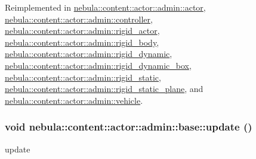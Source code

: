 Reimplemented in \hyperlink{classnebula_1_1content_1_1actor_1_1admin_1_1actor_af4b68cdf9481cd0ad5f56a78bb691997}{nebula::content::actor::admin::actor}, \hyperlink{classnebula_1_1content_1_1actor_1_1admin_1_1controller_a0cac5286fe3874391eea6dabae7ce06a}{nebula::content::actor::admin::controller}, \hyperlink{classnebula_1_1content_1_1actor_1_1admin_1_1rigid__actor_aba5200b2e542e3f0433c89ef026c5673}{nebula::content::actor::admin::rigid\_\-actor}, \hyperlink{classnebula_1_1content_1_1actor_1_1admin_1_1rigid__body_a91d4e1a3e78ee41a5ddea1974a88045d}{nebula::content::actor::admin::rigid\_\-body}, \hyperlink{classnebula_1_1content_1_1actor_1_1admin_1_1rigid__dynamic_ae5350e2820c0e00c36c663fc63a8b83c}{nebula::content::actor::admin::rigid\_\-dynamic}, \hyperlink{classnebula_1_1content_1_1actor_1_1admin_1_1rigid__dynamic__box_a2989dba143de5dabded9ca32702cccaa}{nebula::content::actor::admin::rigid\_\-dynamic\_\-box}, \hyperlink{classnebula_1_1content_1_1actor_1_1admin_1_1rigid__static_a6f209af8d75aa5159b4a2d75fcf2701a}{nebula::content::actor::admin::rigid\_\-static}, \hyperlink{classnebula_1_1content_1_1actor_1_1admin_1_1rigid__static__plane_af1c2da35d02592bf5cad8823775bb2d7}{nebula::content::actor::admin::rigid\_\-static\_\-plane}, and \hyperlink{classnebula_1_1content_1_1actor_1_1admin_1_1vehicle_a3d1b3aec177cf3c759029a487b1c2c9d}{nebula::content::actor::admin::vehicle}.\hypertarget{classnebula_1_1content_1_1actor_1_1admin_1_1base_a1401d047ad4b2459a047644da275cebf}{
\subsubsection[{update}]{\setlength{\rightskip}{0pt plus 5cm}void nebula::content::actor::admin::base::update ()}}
\label{classnebula_1_1content_1_1actor_1_1admin_1_1base_a1401d047ad4b2459a047644da275cebf}


update 

